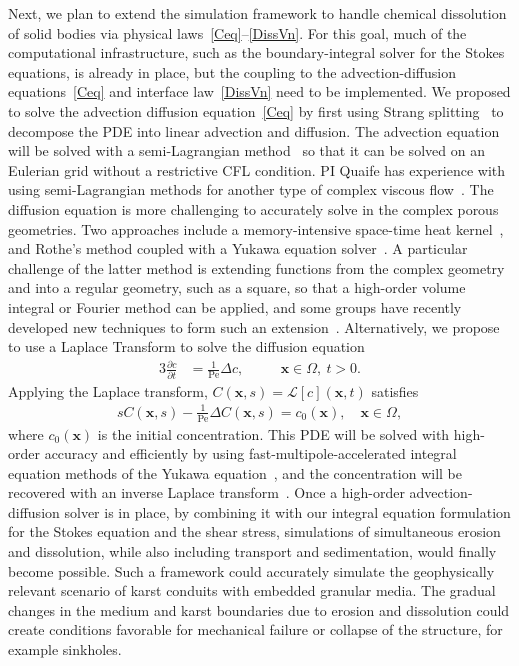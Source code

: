 \documentclass[11pt]{article}
\newcommand{\pd}[2]{ \frac{ \partial #1}{ \partial #2 } }
\newcommand{\bvec}[1]{{\mathbf{#1}}}
\newcommand{\Pe}{\mathrm{Pe}}
\newcommand{\xx}{\bvec{x}}
\begin{document}
Next, we plan to extend the simulation framework to handle chemical dissolution of solid bodies via physical laws~\eqref{Ceq}--\eqref{DissVn}. For this goal, much of the computational infrastructure, such as the boundary-integral solver for the Stokes equations, is already in place, but the coupling to the advection-diffusion equations~\eqref{Ceq} and interface law~\eqref{DissVn} need to be implemented.  We proposed to solve the advection diffusion equation~\eqref{Ceq} by first using Strang splitting~\cite{str1968} to decompose the PDE into linear advection and diffusion.  The advection equation will be solved with a semi-Lagrangian method~\cite{rob1981} so that it can be solved on an Eulerian grid without a restrictive CFL condition. PI Quaife has experience with using semi-Lagrangian methods for another type of complex viscous flow~\cite{kab-qua-bir2017}.  The diffusion equation is more challenging to accurately solve in the complex porous geometries.  Two approaches include a memory-intensive space-time heat kernel~\cite{bar-eps-gre-jia-wan2019, jia-gre-wan2015, li-gre2009}, and Rothe's method coupled with a Yukawa equation solver~\cite{kro-qua2010, cau-cho-chr-sea2016}. A particular challenge of the latter method is extending functions from the complex geometry and into a regular geometry, such as a square, so that a high-order volume integral or Fourier method can be applied, and some groups have recently developed new techniques to form such an extension~\cite{fry-kro-tor2019, fry-leh-tor2019}. Alternatively, we propose to use a Laplace Transform to solve the diffusion equation
\begin{alignat}{3}
  \pd{c}{t} &= \frac{1}{\Pe} \Delta c, \quad &&\xx \in \Omega, \: t>0.
\end{alignat}
Applying the Laplace transform, $C(\xx,s) = \mathcal{L}[c](\xx,t)$ satisfies
\begin{align}
  sC(\xx,s) - \frac{1}{\Pe}\Delta C(\xx,s) = c_0(\xx), 
    \quad \xx \in \Omega,
  \label{eqn:DiffusionLaplace}
\end{align}
where $c_0(\xx)$ is the initial concentration. This PDE will be solved with high-order accuracy and efficiently by using fast-multipole-accelerated integral equation methods of the Yukawa equation~\cite{kro-qua2011}, and the concentration will be recovered with an inverse Laplace transform~\cite{jos-war2006}.  
Once a high-order advection-diffusion solver is in place, by combining it with our integral equation formulation for the Stokes equation and the shear stress, simulations of simultaneous erosion and dissolution, while also including transport and sedimentation, would finally become possible. Such a framework could accurately simulate the geophysically relevant scenario of karst conduits with embedded granular media. The gradual changes in the medium and karst boundaries due to erosion and dissolution could create conditions favorable for mechanical failure or collapse of the structure, for example sinkholes.
\end{document}

